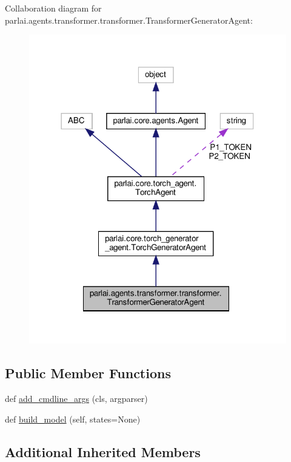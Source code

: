 Collaboration diagram for parlai.\+agents.\+transformer.\+transformer.\+Transformer\+Generator\+Agent\+:
\nopagebreak
\begin{figure}[H]
\begin{center}
\leavevmode
\includegraphics[width=318pt]{classparlai_1_1agents_1_1transformer_1_1transformer_1_1TransformerGeneratorAgent__coll__graph}
\end{center}
\end{figure}
\subsection*{Public Member Functions}
\begin{DoxyCompactItemize}
\item 
def \hyperlink{classparlai_1_1agents_1_1transformer_1_1transformer_1_1TransformerGeneratorAgent_a496b5ccc5efe17f290c37dc094ff74e8}{add\+\_\+cmdline\+\_\+args} (cls, argparser)
\item 
def \hyperlink{classparlai_1_1agents_1_1transformer_1_1transformer_1_1TransformerGeneratorAgent_a473f2a19d6bce412c4c9163c7beb9b09}{build\+\_\+model} (self, states=None)
\end{DoxyCompactItemize}
\subsection*{Additional Inherited Members}


